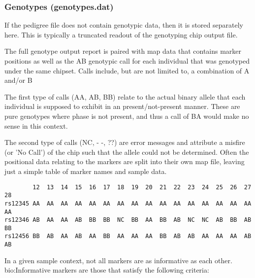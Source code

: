 \subsubsection{Genotypes (genotypes.dat)}

If the pedigree file does not contain genotypic data, then it is stored separately here. This is typically a truncated readout of the genotyping chip output file. 

The full genotype output report is paired with map data that contains marker positions as well as the AB genotypic call for each individual that was genotyped under the same chipset. Calls include, but are not limited to, a combination of A and/or B

The first type of calls (AA, AB, BB) relate to the actual binary allele that each individual is supposed to exhibit in an present/not-present manner. These are pure genotypes where phase is not present, and thus a call of BA would make no sense in this context.

The second type of calls (NC, - -, ??) are error messages and attribute a misfire (or 'No Call') of the chip such that the allele could not be determined.
Often the positional data relating to the markers are split into their own map file, leaving just a simple table of marker names and sample data.

\begingroup
\vspace{10pt}
\begin{lstlisting}
		12	13	14	15	16	17	18	19	20	21	22	23	24	25	26	27	28
rs12345	AA	AA	AA	AA	AA	AA	AA	AA	AA	AA	AA	AA	AA	AA	AA	AA	AA
rs12346	AB	AA	AA	AB	BB	BB	NC	BB	AA	BB	AB	NC	NC	AB	BB	AB	BB
rs12456	BB	AB	AA	AB	AA	BB	AA	AA	AA	BB	AB	AB	AA	AA	AA	AB	AB
\end{lstlisting}
\vspace{-10pt}
\endgroup

In a given sample context, not all markers are as informative as each other.  \gls{bio:Informative marker}s are those that satisfy the following criteria:\label{informativemarkers}

